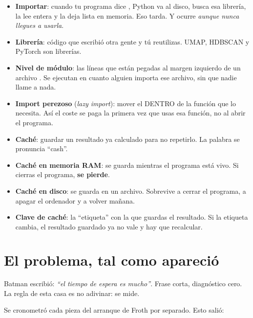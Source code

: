 \documentclass[11pt,a4paper]{article}
\begin{document}
\begin{itemize}
  \item \textbf{Importar}: cuando tu programa dice , Python va al
        disco, busca esa librería, la lee entera y la deja lista en memoria. Eso tarda.
        Y ocurre \emph{aunque nunca llegues a usarla}.
  \item \textbf{Librería}: código que escribió otra gente y tú reutilizas. UMAP, HDBSCAN
        y PyTorch son librerías.
  \item \textbf{Nivel de módulo}: las líneas que están pegadas al margen izquierdo de un
        archivo . Se ejecutan en cuanto alguien importa ese archivo, sin que
        nadie llame a nada.
  \item \textbf{Import perezoso} (\emph{lazy import}): mover el  DENTRO de
        la función que lo necesita. Así el coste se paga la primera vez que usas esa
        función, no al abrir el programa.
  \item \textbf{Caché}: guardar un resultado ya calculado para no repetirlo. La palabra
        se pronuncia ``cash''.
  \item \textbf{Caché en memoria RAM}: se guarda mientras el programa está vivo. Si
        cierras el programa, \textbf{se pierde}.
  \item \textbf{Caché en disco}: se guarda en un archivo. Sobrevive a cerrar el programa,
        a apagar el ordenador y a volver mañana.
  \item \textbf{Clave de caché}: la ``etiqueta'' con la que guardas el resultado. Si la
        etiqueta cambia, el resultado guardado ya no vale y hay que recalcular.
\end{itemize}

\section{El problema, tal como apareció}

Batman escribió: \emph{``el tiempo de espera es mucho''}. Frase corta, diagnóstico cero.
La regla de esta casa es no adivinar: se mide.

Se cronometró cada pieza del arranque de Froth por separado. Esto salió:
\end{document}
